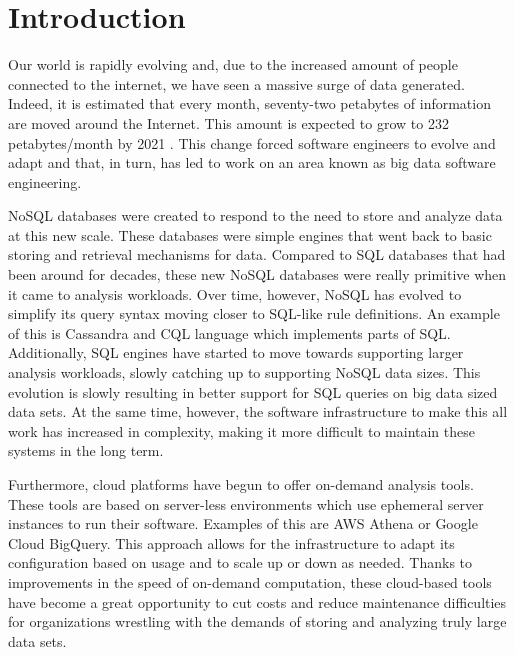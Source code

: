 \chapter{Introduction}
\label{introchap}
Our world is rapidly evolving and, due to the increased amount of people connected to the internet, we have seen a massive surge of data generated. Indeed, it is estimated that every month, seventy-two petabytes of information are moved around the Internet. This amount is expected to grow to 232 petabytes/month by 2021 \cite{ciscoreport}. This change forced software engineers to evolve and adapt and that, in turn, has led to work on an area known as big data software engineering.

NoSQL databases were created to respond to the need to store and analyze data at this new scale. These databases were simple engines that went back to basic storing and retrieval mechanisms for data. Compared to SQL databases that had been around for decades, these new NoSQL databases were really primitive when it came to analysis workloads. Over time, however, NoSQL has evolved to simplify its query syntax moving closer to SQL-like rule definitions. 
An example of this is Cassandra and CQL language which implements parts of SQL. 
Additionally, SQL engines have started to move towards supporting larger analysis workloads, slowly catching up to supporting NoSQL data sizes. This evolution is slowly resulting in better support for SQL queries on big data sized data sets. At the same time, however, the software infrastructure to make this all work has increased in complexity, making it more difficult to maintain these systems in the long term.

Furthermore, cloud platforms have begun to offer on-demand analysis tools. These tools are based on server-less environments which use ephemeral server instances to run their software. 
Examples of this are AWS Athena or Google Cloud BigQuery. 
This approach allows for the infrastructure to adapt its configuration based on usage and to scale up or down as needed. Thanks to improvements in the speed of on-demand computation, these cloud-based tools have become a great opportunity to cut costs and reduce maintenance difficulties for organizations wrestling with the demands of storing and analyzing truly large data sets.

